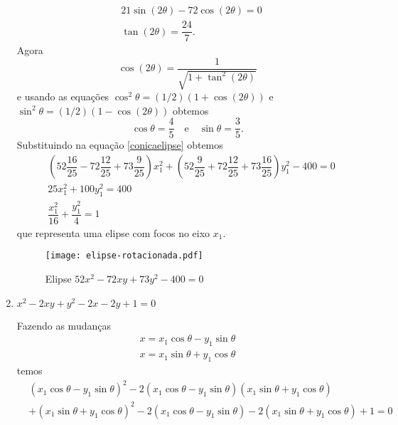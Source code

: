 \begin{exemplos}
\begin{enumerate}
\begin{solucao}
\begin{align*}
        &21\sin(2\theta) - 72\cos(2\theta) = 0\\
        &\tan(2\theta) = \dfrac{24}{7}.
      \end{align*}
      Agora
      \[
        \cos(2\theta) = \dfrac{1}{\sqrt{1 + \tan^2(2\theta)}}
      \]
      e usando as equa\c{c}\~oes $\cos^2\theta = (1/2)(1 + \cos(2\theta))$ e $\sin^2\theta = (1/2)(1 - \cos(2\theta))$ obtemos
      \[
        \cos\theta = \dfrac{4}{5} \quad \mbox{e}\quad \sin\theta = \dfrac{3}{5}.
      \]
      Substituindo na equa\c{c}\~ao \eqref{conicaelipse} obtemos
      \begin{align*}
        &\left(52\dfrac{16}{25} - 72\dfrac{12}{25} + 73\dfrac{9}{25}\right)x_1^2 + \left(52\dfrac{9}{25} + 72\dfrac{12}{25} + 73\dfrac{16}{25}\right)y_1^2 - 400 = 0\\
        &25x_1^2 + 100y_1^2 = 400\\
        &\dfrac{x_1^2}{16} + \dfrac{y_1^2}{4} = 1
      \end{align*}
      que representa uma elipse com focos no eixo $x_1$.
      \begin{figure}[!h]
        \centering
        \caption{Elipse $52x^2 - 72xy + 73y^2 - 400 = 0$}
        \texttt{[image: elipse-rotacionada.pdf]}
      \end{figure}
    \end{solucao}
    \item $x^2 - 2xy + y^2 - 2x - 2y + 1 = 0$
    \begin{solucao}
      Fazendo as mudan\c{c}as
      \begin{align}
        x = x_1\cos\theta - y_1\sin\theta\\
        x = x_1\sin\theta + y_1\cos\theta
      \end{align}
      temos
      \begin{align}\label{conicaparabola}
        &(x_1\cos\theta - y_1\sin\theta)^2 - 2(x_1\cos\theta - y_1\sin\theta)(x_1\sin\theta + y_1\cos\theta)\nonumber \\&+ (x_1\sin\theta + y_1\cos\theta)^2 - 2(x_1\cos\theta - y_1\sin\theta) - 2(x_1\sin\theta + y_1\cos\theta) + 1 = 0\nonumber\\

\end{align}
\end{solucao}
\end{enumerate}
\end{exemplos}
